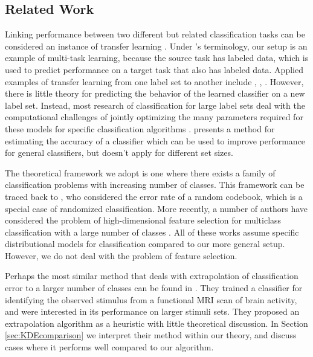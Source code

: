 \documentclass[twoside,11pt]{article}
\begin{document}
\subsection{Related Work}

Linking performance between two different but related classification
tasks can be considered an instance of transfer learning
\citep{pan2010survey}. Under \citeauthor{pan2010survey}'s terminology,
our setup is an example of multi-task learning, because the source
task has labeled data, which is used to predict performance on a
target task that also has labeled data. Applied examples of transfer learning from one label set to another include \cite{oquab2014learning},
\cite{donahue2014decaf}, \cite{sharif2014cnn}. 
However, there is little theory for predicting the behavior of the learned classifier on a new label set. Instead, most research of classification for large label sets deal with the computational challenges of jointly optimizing the many parameters
required for these models for specific classification algorithms \citep{crammer2001algorithmic,
  lee2004multicategory, weston1999support}. \cite{gupta2014training}
presents a method for estimating the accuracy of a classifier which can
be used to improve performance for general classifiers, but doesn't apply for different set sizes.  

The theoretical framework we adopt is one where there exists a family
of classification problems with increasing number of classes. This
framework can be traced back to \cite{Shannon1948}, who considered the error rate of a random codebook, which is a special case of randomized classification. More recently, a number of authors have considered the problem of high-dimensional feature selection for multiclass
classification with a large number of classes \citep{pan2016ultrahigh,
  abramovich2015feature, davis2011bayesian}.  All of these works
assume specific distributional models for classification compared to
our more general setup. However, we do not deal with the problem of
feature selection.

Perhaps the most similar method that deals with extrapolation of classification error to a larger number of classes can be found in \cite{Kay2008a}. They trained a classifier for identifying the observed stimulus from a functional MRI scan of brain activity, and were interested in its performance on larger stimuli sets. They proposed an extrapolation algorithm as a heuristic with little theoretical discussion. In Section \ref{sec:KDEcomparison} we interpret their method within our theory, and discuss cases where it performs well compared to our algorithm.
\end{document}
